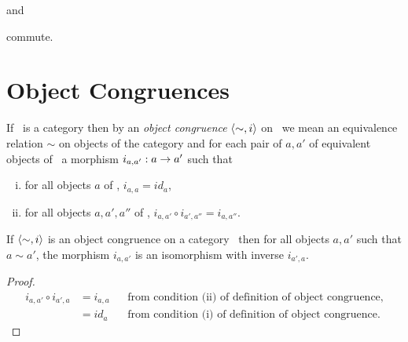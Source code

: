 \documentclass[10pt,a4paper]{article}
\theoremstyle{remark}
\newcommand{\catc}{\cat{C}}
\newcommand{\catcw}{\cat{C}\ }
\newcommand{\term}[1]{\textit{#1}}  %
\begin{document}
and 



commute.


  \section {Object Congruences}

\begin{definition}
If \catcw is a category  then by an \term{object congruence} $\langle\sim,i\rangle$ on \catcw we mean  an equivalence relation $\sim$ on objects of the category and for each pair
of $a, a'$ of equivalent objects of \catcw a morphism $i_{a,a'}:a \rightarrow a'$ such that
\begin{enumerate} [(i)]
\item  for all objects $a$ of \catc, $i_{a,a}=id_a$,
\item for all objects $a, a', a''$ of \catc, $i_{a,a'}\circ i_{a',a''}=i_{a,a''}$.
\end{enumerate} 
\end{definition}

\begin{lemma}
If $\langle\sim,i\rangle$ is an object congruence on a category \catcw then
for all objects $a,a'$ such that $a \sim a'$, the morphism $i_{a,a'}$ is an isomorphism with inverse $i_{a',a}$.
\end{lemma}
\begin{proof}
\begin{align*}
i_{a,a'} \circ i_{a',a} &= i_{a,a} &&\mbox{from condition (ii) of definition of object congruence}, \\
                        &= id_a    &&\mbox{from condition (i) of definition of object congruence}.
\end{align*}
\end{proof}
\end{document}
